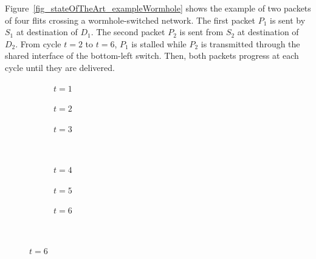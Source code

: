 \documentclass[main.tex]{subfiles}
\begin{document}
\begin{example}
    Figure~\ref{fig_stateOfTheArt_exampleWormhole} shows the example of two
    packets of four flits crossing a wormhole-switched network. The first
    packet $P_1$ is sent by $S_1$ at destination of $D_1$. The second packet
    $P_2$ is sent from $S_2$ at destination of $D_2$. From cycle $t = 2$ to
    $t=6$, $P_1$ is stalled while $P_2$ is transmitted through the shared
    interface of the bottom-left switch. Then, both packets progress at each
    cycle until they are delivered. 

    \begin{figure}
        \captionsetup[subfigure]{labelformat=empty}
        \centering
        
        \begin{subfigure}[b]{0.3\linewidth}
        \centering
            \scalebox{0.25}{}
            \caption{$t=1$}
        \end{subfigure}
         \hspace{5mm}
        \begin{subfigure}[b]{0.3\linewidth}
        \centering
            \scalebox{0.25}{}
            \caption{$t=2$}
        \end{subfigure}
         \hspace{5mm}
        \begin{subfigure}[b]{0.3\linewidth}
        \centering
            \scalebox{0.25}{}
            \caption{$t=3$}
        \end{subfigure}\\

        \vspace{10mm}

        \begin{subfigure}[b]{0.3\linewidth}
        \centering
            \scalebox{0.25}{}
            \caption{$t=4$}
        \end{subfigure}
         \hspace{5mm}
        \begin{subfigure}[b]{0.3\linewidth}
        \centering
            \scalebox{0.25}{}
            \caption{$t=5$}
        \end{subfigure}
         \hspace{5mm}
        \begin{subfigure}[b]{0.3\linewidth}
        \centering
            \scalebox{0.25}{}
            \caption{$t=6$}
        \end{subfigure} \\


\end{figure}
\end{example}
\end{document}
